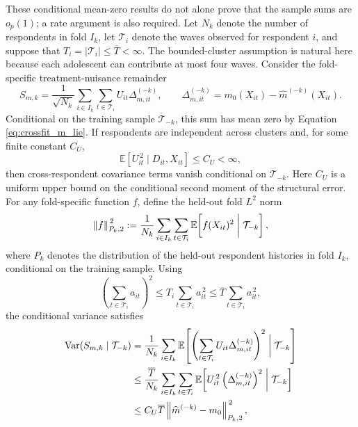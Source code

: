 \documentclass[11pt,oneside,a4paper]{book}
\begin{document}
These conditional mean-zero results do not alone prove that the sample sums are \(o_p(1)\); a rate argument is also required. Let \(N_k\) denote the number of respondents in fold \(I_k\), let \(\mathcal{T}_i\) denote the waves observed for respondent \(i\), and suppose that \(T_i=\lvert\mathcal{T}_i\rvert\leq \overline{T}<\infty\). The bounded-cluster assumption is natural here because each adolescent can contribute at most four waves. Consider the fold-specific treatment-nuisance remainder
\begin{equation}
S_{m,k}
=
\frac{1}{\sqrt{N_k}}
\sum_{i\in I_k}
\sum_{t\in\mathcal{T}_i}
U_{it}\Delta^{(-k)}_{m,it},
\qquad
\Delta^{(-k)}_{m,it}
=
m_0(X_{it})-\widehat{m}^{(-k)}(X_{it}).
\label{eq:crossfit_cluster_sum_m}
\end{equation}
Conditional on the training sample \(\mathcal{T}_{-k}\), this sum has mean zero by Equation \ref{eq:crossfit_m_lie}. If respondents are independent across clusters and, for some finite constant \(C_U\),
\begin{equation}
\mathbb{E}[U_{it}^{\,2}\mid D_{it},X_{it}]
\leq C_U<\infty,
\label{eq:bounded_u_second_moment}
\end{equation}
then cross-respondent covariance terms vanish conditional on \(\mathcal{T}_{-k}\). Here \(C_U\) is a uniform upper bound on the conditional second moment of the structural error. For any fold-specific function \(f\), define the held-out fold \(L^2\) norm
\begin{equation*}
\left\|f\right\|_{P_k,2}^{\,2}
:=
\frac{1}{N_k}
\sum_{i\in I_k}
\sum_{t\in\mathcal{T}_i}
\mathbb{E}\!\left[
f(X_{it})^2
\biggm|\mathcal{T}_{-k}
\right],
\end{equation*}
where \(P_k\) denotes the distribution of the held-out respondent histories in fold \(I_k\), conditional on the training sample. Using
\begin{equation*}
\left(\sum_{t\in\mathcal{T}_i}a_{it}\right)^2
\leq
T_i\sum_{t\in\mathcal{T}_i}a_{it}^{\,2}
\leq
\overline{T}\sum_{t\in\mathcal{T}_i}a_{it}^{\,2},
\end{equation*}
the conditional variance satisfies
\begin{equation}
\begin{aligned}
\operatorname{Var}\!\left(S_{m,k}\mid\mathcal{T}_{-k}\right)
&=
\frac{1}{N_k}
\sum_{i\in I_k}
\mathbb{E}\!\left[
\left(
\sum_{t\in\mathcal{T}_i}
U_{it}\Delta^{(-k)}_{m,it}
\right)^2
\biggm|\mathcal{T}_{-k}
\right] \\
&\leq
\frac{\overline{T}}{N_k}
\sum_{i\in I_k}
\sum_{t\in\mathcal{T}_i}
\mathbb{E}\!\left[
U_{it}^{\,2}
\left(\Delta^{(-k)}_{m,it}\right)^2
\biggm|\mathcal{T}_{-k}
\right] \\
&\leq
C_U\overline{T}
\left\|
\widehat{m}^{(-k)}-m_0
\right\|_{P_k,2}^{\,2},
\end{aligned}
\label{eq:crossfit_variance_bound_m}
\end{equation}
\end{document}
